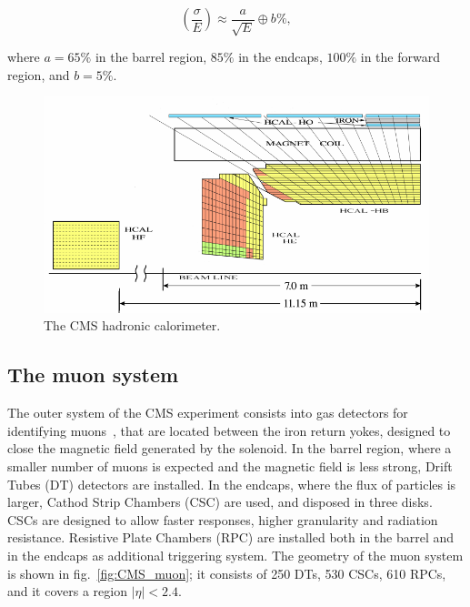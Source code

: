 \begin{equation}
\left( \frac{\sigma}{E} \right) \approx \frac{a}{\sqrt{E}} \oplus b\%,
\end{equation}

\noindent where $a=65\%$ in the barrel region, $85\%$ in the endcaps, $100\%$ in the forward region, and $b=5\%$.

\begin{figure}[!htb]
  \centering
    \includegraphics[width=.7\textwidth]{figures/cmshcal.png}
  \caption{The CMS hadronic calorimeter.~\cite{Chatrchyan:2008zzk}}
  \label{fig:CMS_hcal}
\end{figure}


\subsection{The muon system}


The outer system of the CMS experiment consists into gas detectors for identifying muons~\cite{MUON-TDR}, that are located between the iron return yokes, designed to close the magnetic field generated by the solenoid. In the barrel region, where a smaller number of muons is expected and the magnetic field is less strong, Drift Tubes (DT) detectors are installed. In the endcaps, where the flux of particles is larger, Cathod Strip Chambers (CSC) are used, and disposed in three disks. CSCs are designed to allow faster responses, higher granularity and radiation resistance. Resistive Plate Chambers (RPC) are installed both in the barrel and in the endcaps as additional triggering system. The geometry of the muon system is shown in fig.~\ref{fig:CMS_muon}; it consists of 250 DTs, 530 CSCs, 610 RPCs, and it covers a region $|\eta|<2.4$.

